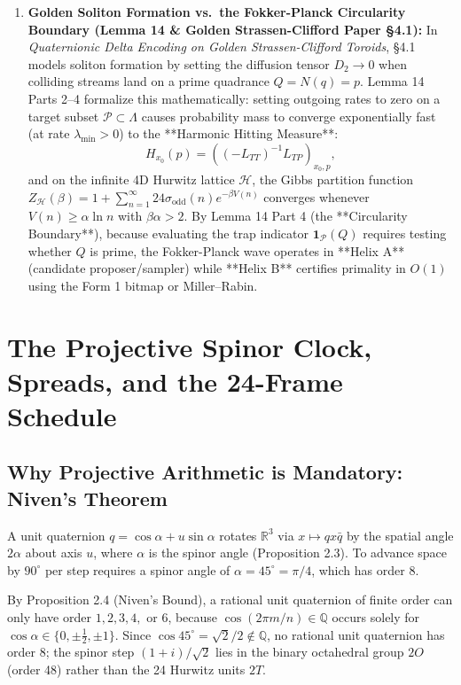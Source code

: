 \documentclass[11pt, a4paper]{article}
\begin{document}
\begin{enumerate}
    \item \textbf{Golden Soliton Formation vs.\ the Fokker-Planck Circularity Boundary (Lemma 14 \& Golden Strassen-Clifford Paper §4.1):}
    In \textit{Quaternionic Delta Encoding on Golden Strassen-Clifford Toroids}, §4.1 models soliton formation by setting the diffusion tensor $D_2 \to 0$ when colliding streams land on a prime quadrance $Q = N(q) = p$. Lemma 14 Parts 2--4 formalize this mathematically: setting outgoing rates to zero on a target subset $\mathcal{P} \subset \Lambda$ causes probability mass to converge exponentially fast (at rate $\lambda_{\min} > 0$) to the **Harmonic Hitting Measure**:
    \begin{equation}
    H_{x_0}(p) = \left((-L_{TT})^{-1} L_{TP}\right)_{x_0, p},
    \end{equation}
    and on the infinite 4D Hurwitz lattice $\mathcal{H}$, the Gibbs partition function $Z_{\mathcal{H}}(\beta) = 1 + \sum_{n=1}^\infty 24\sigma_{\text{odd}}(n)e^{-\beta V(n)}$ converges whenever $V(n) \ge \alpha \ln n$ with $\beta\alpha > 2$. By Lemma 14 Part 4 (the **Circularity Boundary**), because evaluating the trap indicator $\mathbf{1}_{\mathcal{P}}(Q)$ requires testing whether $Q$ is prime, the Fokker-Planck wave operates in **Helix A** (candidate proposer/sampler) while **Helix B** certifies primality in $O(1)$ using the Form 1 bitmap or Miller--Rabin.
\end{enumerate}

\section{The Projective Spinor Clock, Spreads, and the 24-Frame Schedule}

\subsection{Why Projective Arithmetic is Mandatory: Niven's Theorem}
A unit quaternion $q = \cos\alpha + u\sin\alpha$ rotates $\mathbb{R}^3$ via $x \mapsto qx\bar{q}$ by the spatial angle $2\alpha$ about axis $u$, where $\alpha$ is the spinor angle (Proposition 2.3). To advance space by $90^\circ$ per step requires a spinor angle of $\alpha = 45^\circ = \pi/4$, which has order $8$.

By Proposition 2.4 (Niven's Bound), a rational unit quaternion of finite order can only have order $1, 2, 3, 4,$ or $6$, because $\cos(2\pi m/n) \in \mathbb{Q}$ occurs solely for $\cos\alpha \in \{0, \pm\frac{1}{2}, \pm 1\}$. Since $\cos 45^\circ = \sqrt{2}/2 \notin \mathbb{Q}$, no rational unit quaternion has order $8$; the spinor step $(1+i)/\sqrt{2}$ lies in the binary octahedral group $2O$ (order 48) rather than the 24 Hurwitz units $2T$.
\end{document}

